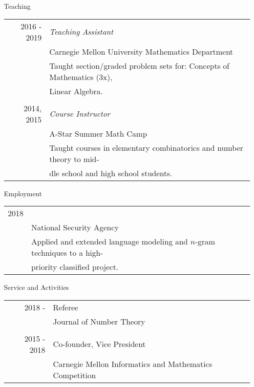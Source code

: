 \documentclass{article}
\begin{document}
\newpage
\Large{Teaching}\vspace{0.2in}\\
\normalsize
\begin{tabular}{r l}
	2016 - 2019 & \textit{Teaching Assistant}\\
	& Carnegie Mellon University Mathematics Department\\
	& \small{Taught section/graded problem sets for: Concepts of Mathematics (3x),}\\
	& \small{Linear Algebra.} \normalsize\\
	&\\
	2014, 2015 & \textit{Course Instructor}\\
	& A-Star Summer Math Camp\\
	& \small{Taught courses in elementary combinatorics and number theory to mid-}\\
	& \small{dle school and high school students}.
\end{tabular}

\vspace{0.25in}
\Large{Employment}\vspace{0.2in}\\
\normalsize
\begin{tabular}{r l}
	2018 & \text{Research Intern}\\
	& National Security Agency\\
	&\small{Applied and extended language modeling and $n$-gram techniques to a high-}\\
	&\small{priority classified project.}
\end{tabular}

\vspace{0.25in}
\Large{Service and Activities}\vspace{0.2in}\\
\normalsize
\begin{tabular}{r l}
	2018 - & Referee\\
	& Journal of Number Theory\\
	&\\
	2015 - 2018 & Co-founder, Vice President\\
	& Carnegie Mellon Informatics and Mathematics Competition
\end{tabular}
\end{document}
